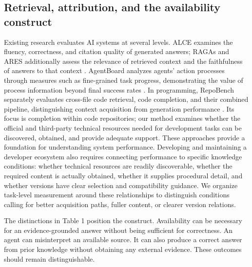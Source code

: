 \documentclass[manuscript,review,anonymous]{acmart}
\begin{document}
\subsection{Retrieval, attribution, and the availability construct}\label{retrieval-attribution-and-the-availability-construct}

Existing research evaluates AI systems at several levels. ALCE examines the fluency, correctness, and citation quality of generated answers; RAGAs and ARES additionally assess the relevance of retrieved context and the faithfulness of answers to that context \citep{gao2023alce, ragas2024, ares2024}. AgentBoard analyzes agents' action processes through measures such as fine-grained task progress, demonstrating the value of process information beyond final success rates \citep{ma2024agentboard}. In programming, RepoBench separately evaluates cross-file code retrieval, code completion, and their combined pipeline, distinguishing context acquisition from generation performance \citep{liu2024repobench}. Its focus is completion within code repositories; our method examines whether the official and third-party technical resources needed for development tasks can be discovered, obtained, and provide adequate support. These approaches provide a foundation for understanding system performance. Developing and maintaining a developer ecosystem also requires connecting performance to specific knowledge conditions: whether technical resources are readily discoverable, whether the required content is actually obtained, whether it supplies procedural detail, and whether versions have clear selection and compatibility guidance. We organize task-level measurement around these relationships to distinguish conditions calling for better acquisition paths, fuller content, or clearer version relations.

The distinctions in Table 1 position the construct. Availability can be necessary for an evidence-grounded answer without being sufficient for correctness. An agent can misinterpret an available source. It can also produce a correct answer from prior knowledge without obtaining any external evidence. These outcomes should remain distinguishable.
\end{document}
